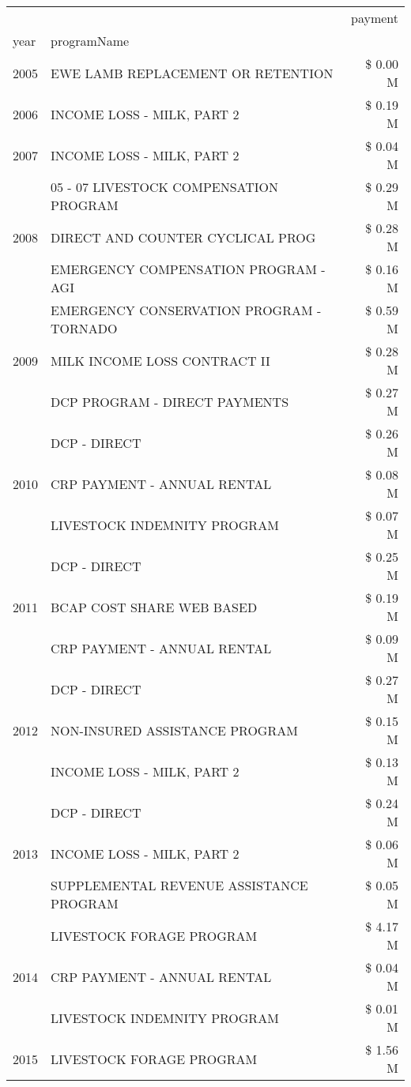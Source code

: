 \begin{tabular}{llr}
\toprule
 &  & payment \\
year & programName &  \\
\midrule
2005 & EWE LAMB REPLACEMENT OR RETENTION & \$ 0.00 M \\
\cline{1-3}
2006 & INCOME LOSS - MILK, PART 2 & \$ 0.19 M \\
\cline{1-3}
2007 & INCOME LOSS - MILK, PART 2 & \$ 0.04 M \\
\cline{1-3}
\multirow[t]{3}{*}{2008} & 05 - 07 LIVESTOCK COMPENSATION PROGRAM & \$ 0.29 M \\
 & DIRECT AND COUNTER CYCLICAL PROG & \$ 0.28 M \\
 & EMERGENCY COMPENSATION PROGRAM - AGI & \$ 0.16 M \\
\cline{1-3}
\multirow[t]{3}{*}{2009} & EMERGENCY CONSERVATION PROGRAM - TORNADO & \$ 0.59 M \\
 & MILK INCOME LOSS CONTRACT II & \$ 0.28 M \\
 & DCP PROGRAM - DIRECT PAYMENTS & \$ 0.27 M \\
\cline{1-3}
\multirow[t]{3}{*}{2010} & DCP - DIRECT & \$ 0.26 M \\
 & CRP PAYMENT - ANNUAL RENTAL & \$ 0.08 M \\
 & LIVESTOCK INDEMNITY PROGRAM & \$ 0.07 M \\
\cline{1-3}
\multirow[t]{3}{*}{2011} & DCP - DIRECT & \$ 0.25 M \\
 & BCAP COST SHARE WEB BASED & \$ 0.19 M \\
 & CRP PAYMENT - ANNUAL RENTAL & \$ 0.09 M \\
\cline{1-3}
\multirow[t]{3}{*}{2012} & DCP - DIRECT & \$ 0.27 M \\
 & NON-INSURED ASSISTANCE PROGRAM & \$ 0.15 M \\
 & INCOME LOSS - MILK, PART 2 & \$ 0.13 M \\
\cline{1-3}
\multirow[t]{3}{*}{2013} & DCP - DIRECT & \$ 0.24 M \\
 & INCOME LOSS - MILK, PART 2 & \$ 0.06 M \\
 & SUPPLEMENTAL REVENUE ASSISTANCE PROGRAM & \$ 0.05 M \\
\cline{1-3}
\multirow[t]{3}{*}{2014} & LIVESTOCK FORAGE PROGRAM & \$ 4.17 M \\
 & CRP PAYMENT - ANNUAL RENTAL & \$ 0.04 M \\
 & LIVESTOCK INDEMNITY PROGRAM & \$ 0.01 M \\
\cline{1-3}
\multirow[t]{3}{*}{2015} & LIVESTOCK FORAGE PROGRAM & \$ 1.56 M \\

\end{tabular}
